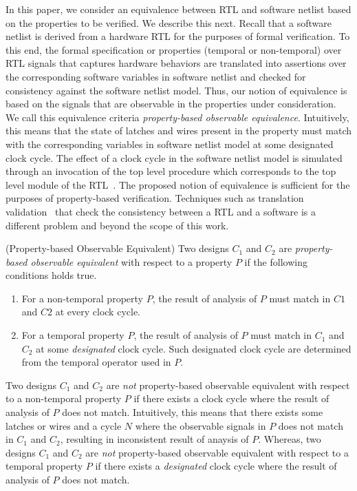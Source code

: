 In this paper, we consider an equivalence between RTL and software netlist 
based on the properties to be verified.  We describe this next.
% 
%
Recall that a software netlist is derived from a hardware RTL for the
purposes of formal verification.  To this end, the formal specification or 
properties (temporal or non-temporal) over RTL signals that captures hardware behaviors 
are translated into assertions over the corresponding software variables in 
software netlist and checked for consistency against the software
netlist model.  Thus, our notion of equivalence is based on the signals 
that are observable in the properties under consideration.  We call this equivalence criteria 
\emph{property-based observable equivalence}.  
Intuitively, this means that the state of latches and wires 
present in the property must match with the corresponding variables in software 
netlist model at some designated clock cycle.  The effect of a clock cycle 
in the software netlist model is simulated through an invocation of the top 
level procedure which corresponds to the top level module of the RTL~\cite{mtk2016}.  
The proposed notion of equivalence is sufficient for the purposes of property-based 
verification.
Techniques such as translation validation~\cite{mtk2016} that check the 
consistency between a RTL and a software is a different problem and beyond 
the scope of this work.
%
\begin{definition} (Property-based Observable Equivalent) 
  Two designs $C_1$ and $C_2$ are \emph{property-based observable equivalent} with
  respect to a property $P$ if the following conditions holds true. 
  \begin{enumerate}
    \item For a non-temporal property $P$, the result of analysis of $P$ must
      match in $C1$ and $C2$ at every clock cycle.  
   \item For a temporal property $P$, the result of analysis of $P$ must 
     match in $C_1$ and $C_2$ at some \emph{designated} clock cycle.  Such
      designated clock cycle are determined from the temporal operator used in $P$. 
  \end{enumerate}
\end{definition}
%
Two designs $C_1$ and $C_2$ are \emph{not} property-based observable equivalent 
with respect to a non-temporal property $P$ if there exists a clock cycle where 
the result of analysis of $P$ does not match.  Intuitively, this means that 
there exists some latches or wires and a cycle $N$ where the observable signals in $P$ 
does not match in $C_1$ and $C_2$, resulting in inconsistent result of anaysis of $P$. 
%
Whereas, two designs $C_1$ and $C_2$ are \emph{not} property-based observable equivalent 
with respect to a temporal property $P$ if there exists a \emph{designated} clock cycle 
where the result of analysis of $P$ does not match. 



